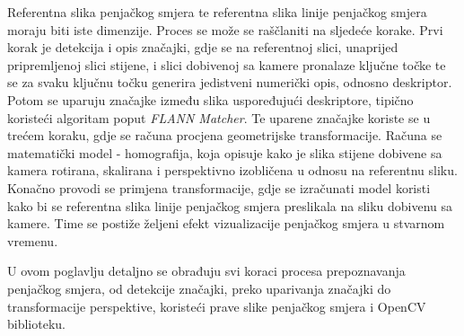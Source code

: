 Referentna slika penjačkog smjera te referentna slika linije penjačkog smjera moraju biti iste dimenzije. Proces se može se raščlaniti na sljedeće korake.
Prvi korak je detekcija i opis značajki, gdje se na referentnoj slici, unaprijed pripremljenoj slici stijene, i slici dobivenoj sa kamere pronalaze ključne točke te se za svaku ključnu točku generira jedistveni numerički opis, odnosno deskriptor. Potom se uparuju značajke između slika uspoređujući deskriptore, tipično koristeći algoritam poput \textit{FLANN Matcher}. 
Te uparene značajke koriste se u trećem koraku, gdje se računa procjena geometrijske transformacije. Računa se matematički model - homografija, koja opisuje kako je slika stijene dobivene sa kamera rotirana, skalirana i perspektivno izobličena u odnosu na referentnu sliku. Konačno provodi se primjena transformacije, gdje se izračunati model koristi kako bi se referentna slika linije penjačkog smjera preslikala na sliku dobivenu sa kamere. Time se postiže željeni efekt vizualizacije penjačkog smjera u stvarnom vremenu.

U ovom poglavlju detaljno se obrađuju svi koraci procesa prepoznavanja penjačkog smjera, od detekcije značajki, preko uparivanja značajki do transformacije perspektive, koristeći prave slike penjačkog smjera i OpenCV biblioteku.




